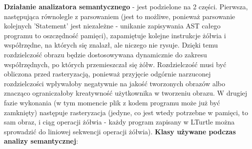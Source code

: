 \documentclass{article}
\begin{document}
\textbf{Działanie analizatora semantycznego} - jest podzielone na 2 części.
Pierwsza, następująca równolegle z parsowaniem (jest to możliwe, ponieważ parsowanie kolejnych 'Statement' jest niezależne - unikanie zapisywania AST całego programu to oszczędność pamięci), zapamiętuje kolejne instrukcje żółwia i współrzędne, na których się znalazł, ale niczego nie rysuje. Dzięki temu rozdzielczość obrazu będzie dostosowywana dynamicznie do zakresu współrzędnych, po których przemieszczał się żółw. Rozdzielczość musi być obliczona przed rasteryzacją, ponieważ przyjęcie odgórnie narzuconej rozdzielczości wpływałoby negatywnie na jakość tworzonych obrazów albo znacząco ograniczałoby kreatywność użytkownika w tworzeniu obrazu. W drugiej fazie wykonania (w tym momencie plik z kodem programu może już być zamknięty) następuje rasteryzacja (jedyne, co jest wtedy potrzebne w pamięci, to sam obraz, i ciąg operacji żółwia - każdy program zapisany w LTurtle można sprowadzić do liniowej sekwencji operacji żółwia).\newline{}\newline{}
\textbf{Klasy używane podczas analizy semantycznej}:
\end{document}

